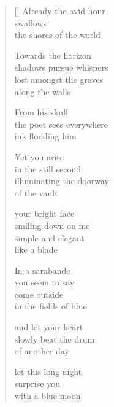 \documentclass[12pt,a4paper]{article}
\begin{document}

\newpage

\poemtitle{}

\settowidth{\versewidth}{Yet you arise in the still second}

\bigskip

\begin{verse}[\versewidth]
  Already the avid hour \\
  swallows \\
  the shores of the world

  Towards the horizon \\
  shadows pursue whispers \\
  lost amongst the graves \\
  along the walls

  From his skull \\
  the poet sees everywhere \\
  ink flooding him

  Yet you arise \\
  in the still second \\
  illuminating the doorway \\
  of the vault

  your bright face \\
  smiling down on me \\
  simple and elegant \\
  like a blade

  In a sarabande \\
  you seem to say \\
  come outside \\
  in the fields of blue

  and let your heart \\
  slowly beat the drum \\
  of another day

  let this long night \\
  surprise you \\
  with a blue moon
\end{verse}


\newpage

\poemtitle{}

\settowidth{\versewidth}{my lips still reach for the heavens}

\bigskip
\end{document}
